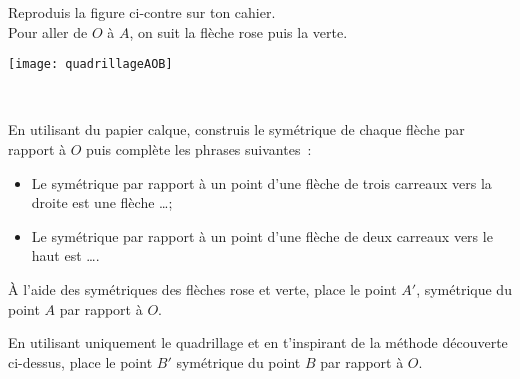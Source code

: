 
\begin{activite}

\begin{minipage}[c]{0.62\linewidth}
\begin{partie}
Reproduis la figure ci-contre sur ton cahier. \\[0.5em]
Pour aller de $O$ à $A$, on suit la flèche rose puis la verte.
\end{partie}
 \end{minipage}
  \qquad \begin{minipage}[c]{0.36\linewidth}
  \texttt{[image: quadrillageAOB]}
  \end{minipage} \\

\begin{partie}
En utilisant du papier calque, construis le symétrique de chaque flèche par rapport à $O$ puis complète les phrases suivantes : 
\begin{itemize}
 \item Le symétrique par rapport à un point d'une flèche de trois carreaux vers la droite est une flèche \ldots ;
 \item Le symétrique par rapport à un point d'une flèche de deux carreaux vers le haut est \ldots.
 \end{itemize}
\end{partie}
                
\begin{partie}
À l'aide des symétriques des flèches rose et verte, place le point $A'$, symétrique du point $A$ par rapport à $O$.
\end{partie}
         
\begin{partie}
En utilisant uniquement le quadrillage et en t'inspirant de la méthode découverte ci-dessus, place le point $B'$ symétrique du point $B$ par rapport à $O$.
\end{partie}

\end{activite}



